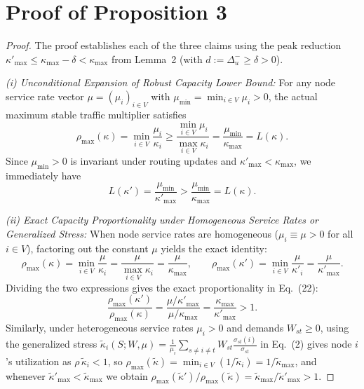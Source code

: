 \documentclass[11pt]{article}
\newcommand{\rev}[1]{#1}
\newenvironment{IEEEproof}{\begin{proof}}{\end{proof}}
\begin{document}
\section{Proof of Proposition 3}
\label{app:proof_prop_perf_bridge}
\begin{IEEEproof}
\rev{The proof establishes each of the three claims using the peak reduction $\kappa'_{\max} \le \kappa_{\max} - \delta < \kappa_{\max}$ from Lemma~2 (with $d := \Delta_u^- \ge \delta > 0$).

\noindent\textit{(i) Unconditional Expansion of Robust Capacity Lower Bound:}
For any node service rate vector $\mu = (\mu_i)_{i \in V}$ with $\mu_{\min} = \min_{i \in V} \mu_i > 0$, the actual maximum stable traffic multiplier satisfies
\begin{equation}
\rho_{\max}(\kappa) = \min_{i \in V} \frac{\mu_i}{\kappa_i} \ge \frac{\min_{i \in V}\mu_i}{\max_{i \in V}\kappa_i} = \frac{\mu_{\min}}{\kappa_{\max}} = L(\kappa).
\end{equation}
Since $\mu_{\min} > 0$ is invariant under routing updates and $\kappa'_{\max} < \kappa_{\max}$, we immediately have
\begin{equation}
L(\kappa') = \frac{\mu_{\min}}{\kappa'_{\max}} > \frac{\mu_{\min}}{\kappa_{\max}} = L(\kappa).
\end{equation}

\noindent\textit{(ii) Exact Capacity Proportionality under Homogeneous Service Rates or Generalized Stress:}
When node service rates are homogeneous ($\mu_i \equiv \mu > 0$ for all $i \in V$), factoring out the constant $\mu$ yields the exact identity:
\begin{equation}
\rho_{\max}(\kappa) = \min_{i \in V} \frac{\mu}{\kappa_i} = \frac{\mu}{\max_{i \in V}\kappa_i} = \frac{\mu}{\kappa_{\max}}, \qquad \rho_{\max}(\kappa') = \min_{i \in V} \frac{\mu}{\kappa'_i} = \frac{\mu}{\kappa'_{\max}}.
\end{equation}
Dividing the two expressions gives the exact proportionality in Eq.~(22):
\begin{equation}
\frac{\rho_{\max}(\kappa')}{\rho_{\max}(\kappa)} = \frac{\mu / \kappa'_{\max}}{\mu / \kappa_{\max}} = \frac{\kappa_{\max}}{\kappa'_{\max}} > 1.
\end{equation}
Similarly, under heterogeneous service rates $\mu_i > 0$ and demands $W_{st} \ge 0$, using the generalized stress $\widetilde{\kappa}_i(S;W,\mu) = \frac{1}{\mu_i}\sum_{s\neq i\neq t} W_{st}\frac{\sigma_{st}(i)}{\sigma_{st}}$ in Eq.~(2) gives node $i$'s utilization as $\rho\,\widetilde{\kappa}_i < 1$, so $\rho_{\max}(\widetilde{\kappa}) = \min_{i \in V}(1/\widetilde{\kappa}_i) = 1/\widetilde{\kappa}_{\max}$, and whenever $\widetilde{\kappa}'_{\max} < \widetilde{\kappa}_{\max}$ we obtain $\rho_{\max}(\widetilde{\kappa}')/\rho_{\max}(\widetilde{\kappa}) = \widetilde{\kappa}_{\max}/\widetilde{\kappa}'_{\max} > 1$.

}
\end{IEEEproof}
\end{document}
